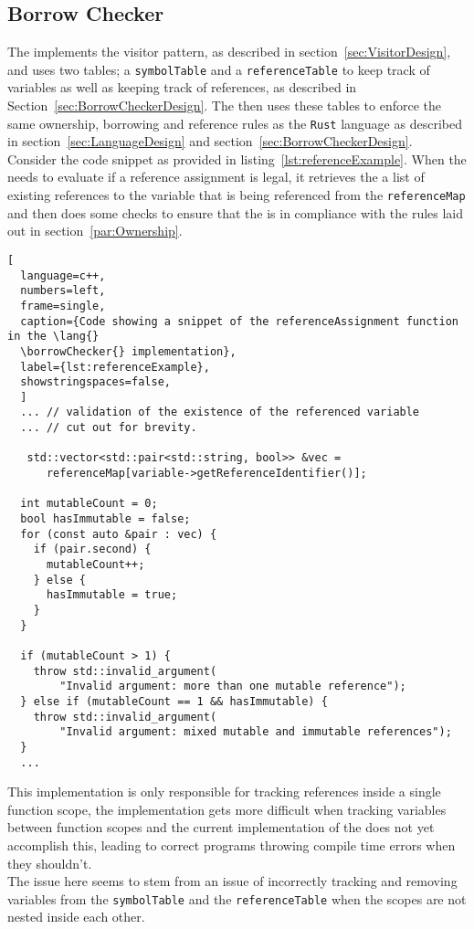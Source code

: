 \subsection{Borrow Checker}
\label{sec:BorrowCheckerImpl}

The \borrowChecker{} implements the visitor pattern, as described in
section~\ref{sec:VisitorDesign}, and uses two tables; a
\texttt{symbolTable} and a \texttt{referenceTable} to keep track of variables as well
as keeping track of references, as described in
Section~\ref{sec:BorrowCheckerDesign}. The \borrowChecker{} then uses these tables to enforce the
same ownership, borrowing and reference rules as the \texttt{Rust} language as described
in section~\ref{sec:LanguageDesign} and section~\ref{sec:BorrowCheckerDesign}. \\

Consider the code snippet as provided in listing~\ref{lst:referenceExample}. When the
\borrowChecker{} needs to evaluate if a reference assignment is legal, it retrieves
the a list of existing references to the variable that is being referenced from the
\texttt{referenceMap} and then does some checks to ensure that the \ast{} is in
compliance with the rules laid out in section~\ref{par:Ownership}.

\begin{lstlisting}[
  language=c++,
  numbers=left,
  frame=single,
  caption={Code showing a snippet of the referenceAssignment function in the \lang{}
  \borrowChecker{} implementation},
  label={lst:referenceExample},
  showstringspaces=false,
  ]
  ... // validation of the existence of the referenced variable 
  ... // cut out for brevity. 

   std::vector<std::pair<std::string, bool>> &vec =
      referenceMap[variable->getReferenceIdentifier()]; 

  int mutableCount = 0;
  bool hasImmutable = false;
  for (const auto &pair : vec) {
    if (pair.second) {
      mutableCount++;
    } else {
      hasImmutable = true;
    }
  }

  if (mutableCount > 1) {
    throw std::invalid_argument(
        "Invalid argument: more than one mutable reference");
  } else if (mutableCount == 1 && hasImmutable) {
    throw std::invalid_argument(
        "Invalid argument: mixed mutable and immutable references");
  }
  ...
\end{lstlisting}

This implementation is only responsible for tracking references inside a single
function scope, the implementation gets more difficult when tracking variables
between function scopes and the current implementation of the \borrowChecker{} does
not yet accomplish this, leading to correct programs throwing compile time errors when
they shouldn't. \\

The issue here seems to stem from an issue of incorrectly tracking and removing
variables from the \texttt{symbolTable} and the \texttt{referenceTable} when the
scopes are not nested inside each other.
